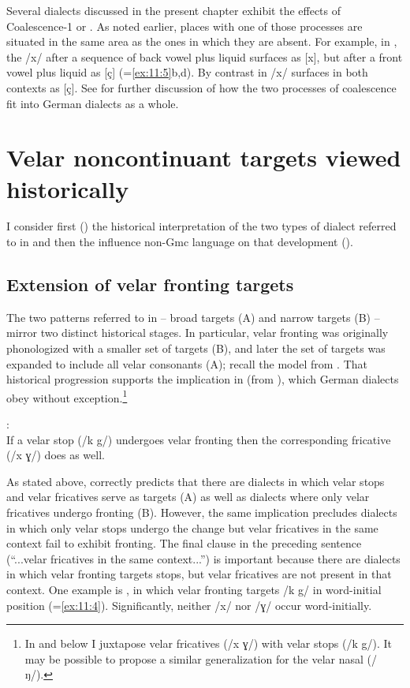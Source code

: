 Several dialects discussed in the present chapter exhibit the effects of Co\-a\-les\-cence-1 or . As noted earlier, places with one of those processes are situated in the same area as the ones in which they are absent. For example, in , the /x/ after a sequence of back vowel plus liquid surfaces as [x], but after a front vowel plus liquid as [ç] (=\ref{ex:11:5}b,d). By contrast in  /x/ surfaces in both contexts as [ç]. See  for further discussion of how the two processes of coalescence fit into German dialects as a whole.

\section{{Velar} {noncontinuant} {targets} {viewed} {historically} }\label{sec:11.9}

I consider first () the historical interpretation of the two types of dialect referred to in  and then the influence non-Gmc language on that development ().

\subsection{Extension of velar fronting targets}\label{sec:11.9.1}

The two patterns referred to in  -- broad targets (A) and narrow targets (B) -- mirror two distinct historical stages. In particular, velar fronting was originally phonologized with a smaller set of targets (B), and later the set of targets was expanded to include all velar consonants (A); recall the  model from . That historical progression supports the implication in  (from ), which German dialects obey without exception.\footnote{{In  and below I juxtapose velar fricatives (/x ɣ/) with velar stops (/k g/). It may be possible to propose a similar generalization for the velar nasal (/ŋ/).} }

\ea%
\label{ex:11:48}\textsc{}:\\
    If a velar stop (/k g/) undergoes velar fronting then the corresponding fricative (/x ɣ/) does as well.
\z

As stated above,  correctly predicts that there are dialects in which velar stops and velar fricatives serve as targets (A) as well as dialects where only velar fricatives undergo fronting (B). However, the same implication precludes dialects in which only velar stops undergo the change but velar fricatives in the same context fail to exhibit fronting. The final clause in the preceding sentence (“...velar fricatives in the same context...”) is important because there are dialects in which velar fronting targets stops, but velar fricatives are not present in that context. One example is , in which velar fronting targets /k g/ in word-initial position (=\ref{ex:11:4}). Significantly, neither /x/ nor /ɣ/ occur word-initially.

